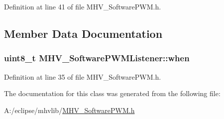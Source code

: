 \-Definition at line 41 of file \-M\-H\-V\-\_\-\-Software\-P\-W\-M.\-h.



\subsection{\-Member \-Data \-Documentation}
\hypertarget{class_m_h_v___software_p_w_m_listener_ab3f5e55e2768e82057462c6af8514904}{
\subsubsection[{when}]{\setlength{\rightskip}{0pt plus 5cm}uint8\-\_\-t {\bf \-M\-H\-V\-\_\-\-Software\-P\-W\-M\-Listener\-::when}}}
\label{class_m_h_v___software_p_w_m_listener_ab3f5e55e2768e82057462c6af8514904}


\-Definition at line 35 of file \-M\-H\-V\-\_\-\-Software\-P\-W\-M.\-h.



\-The documentation for this class was generated from the following file\-:\begin{DoxyCompactItemize}
\item 
\-A\-:/eclipse/mhvlib/\hyperlink{_m_h_v___software_p_w_m_8h}{\-M\-H\-V\-\_\-\-Software\-P\-W\-M.\-h}\end{DoxyCompactItemize}
